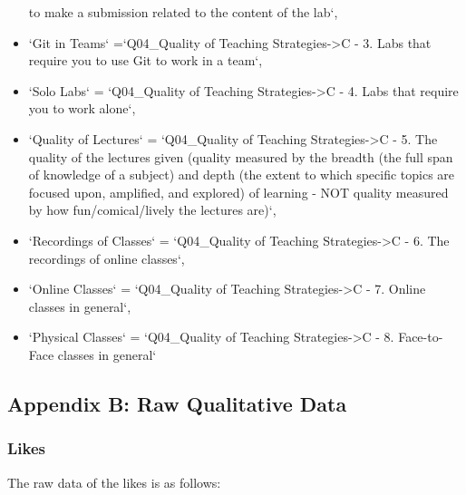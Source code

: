 \documentclass[
]{article}
\begin{document}
\begin{itemize}
  to make a submission related to the content of the lab`,
\item
  `Git in Teams` =`Q04\_Quality of Teaching Strategies-\textgreater C -
  3. Labs that require you to use Git to work in a team`,
\item
  `Solo Labs` = `Q04\_Quality of Teaching Strategies-\textgreater C - 4.
  Labs that require you to work alone`,
\item
  `Quality of Lectures` = `Q04\_Quality of Teaching
  Strategies-\textgreater C - 5. The quality of the lectures given
  (quality measured by the breadth (the full span of knowledge of a
  subject) and depth (the extent to which specific topics are focused
  upon, amplified, and explored) of learning - NOT quality measured by
  how fun/comical/lively the lectures are)`,
\item
  `Recordings of Classes` = `Q04\_Quality of Teaching
  Strategies-\textgreater C - 6. The recordings of online classes`,
\item
  `Online Classes` = `Q04\_Quality of Teaching Strategies-\textgreater C
  - 7. Online classes in general`,
\item
  `Physical Classes` = `Q04\_Quality of Teaching
  Strategies-\textgreater C - 8. Face-to-Face classes in general`
\end{itemize}

\subsection{Appendix B: Raw Qualitative
Data}\label{appendix-b-raw-qualitative-data}

\subsubsection{Likes}\label{likes}

The raw data of the likes is as follows:
\end{document}
